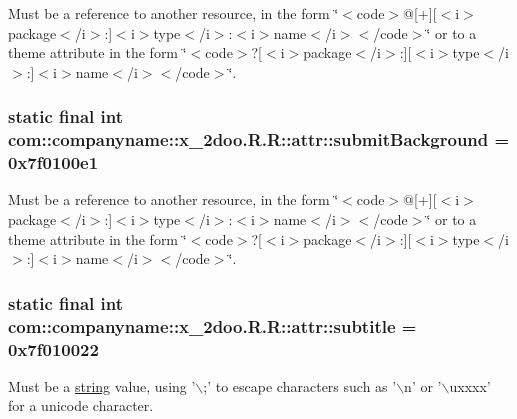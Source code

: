 Must be a reference to another resource, in the form \char`\"{}$<$code$>$@\mbox{[}+\mbox{]}\mbox{[}$<$i$>$package$<$/i$>$:\mbox{]}$<$i$>$type$<$/i$>$:$<$i$>$name$<$/i$>$$<$/code$>$\char`\"{} or to a theme attribute in the form \char`\"{}$<$code$>$?\mbox{[}$<$i$>$package$<$/i$>$:\mbox{]}\mbox{[}$<$i$>$type$<$/i$>$:\mbox{]}$<$i$>$name$<$/i$>$$<$/code$>$\char`\"{}. \hypertarget{classcom_1_1companyname_1_1x__2doo_1_1_r_1_1attr_97fe3d42a75cb3e115411618038eea4b}{
\subsubsection[{submitBackground}]{\setlength{\rightskip}{0pt plus 5cm}static final int com::companyname::x\_\-2doo.R.R::attr::submitBackground = 0x7f0100e1}}
\label{classcom_1_1companyname_1_1x__2doo_1_1_r_1_1attr_97fe3d42a75cb3e115411618038eea4b}


Must be a reference to another resource, in the form \char`\"{}$<$code$>$@\mbox{[}+\mbox{]}\mbox{[}$<$i$>$package$<$/i$>$:\mbox{]}$<$i$>$type$<$/i$>$:$<$i$>$name$<$/i$>$$<$/code$>$\char`\"{} or to a theme attribute in the form \char`\"{}$<$code$>$?\mbox{[}$<$i$>$package$<$/i$>$:\mbox{]}\mbox{[}$<$i$>$type$<$/i$>$:\mbox{]}$<$i$>$name$<$/i$>$$<$/code$>$\char`\"{}. \hypertarget{classcom_1_1companyname_1_1x__2doo_1_1_r_1_1attr_98394940b75038e43d2df2a9cb49c7b9}{
\subsubsection[{subtitle}]{\setlength{\rightskip}{0pt plus 5cm}static final int com::companyname::x\_\-2doo.R.R::attr::subtitle = 0x7f010022}}
\label{classcom_1_1companyname_1_1x__2doo_1_1_r_1_1attr_98394940b75038e43d2df2a9cb49c7b9}


Must be a \hyperlink{classcom_1_1companyname_1_1x__2doo_1_1_r_1_1string}{string} value, using '$\backslash$;' to escape characters such as '$\backslash$n' or '$\backslash$uxxxx' for a unicode character. 


